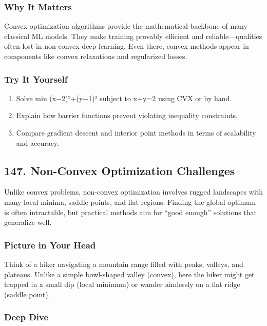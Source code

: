 \documentclass[
  letterpaper,
  DIV=11,
  numbers=noendperiod]{scrreprt}
\providecommand{\tightlist}{%
  \setlength{\itemsep}{0pt}\setlength{\parskip}{0pt}}
\begin{document}
\subsubsection{Why It Matters}\label{why-it-matters-43}

Convex optimization algorithms provide the mathematical backbone of many
classical ML models. They make training provably efficient and
reliable---qualities often lost in non-convex deep learning. Even there,
convex methods appear in components like convex relaxations and
regularized losses.

\subsubsection{Try It Yourself}\label{try-it-yourself-145}

\begin{enumerate}
\def\labelenumi{\arabic{enumi}.}
\tightlist
\item
  Solve min (x−2)²+(y−1)² subject to x+y=2 using CVX or by hand.
\item
  Explain how barrier functions prevent violating inequality
  constraints.
\item
  Compare gradient descent and interior point methods in terms of
  scalability and accuracy.
\end{enumerate}

\subsection{147. Non-Convex Optimization
Challenges}\label{non-convex-optimization-challenges}

Unlike convex problems, non-convex optimization involves rugged
landscapes with many local minima, saddle points, and flat regions.
Finding the global optimum is often intractable, but practical methods
aim for ``good enough'' solutions that generalize well.

\subsubsection{Picture in Your Head}\label{picture-in-your-head-146}

Think of a hiker navigating a mountain range filled with peaks, valleys,
and plateaus. Unlike a simple bowl-shaped valley (convex), here the
hiker might get trapped in a small dip (local minimum) or wander
aimlessly on a flat ridge (saddle point).

\subsubsection{Deep Dive}\label{deep-dive-146}
\end{document}
